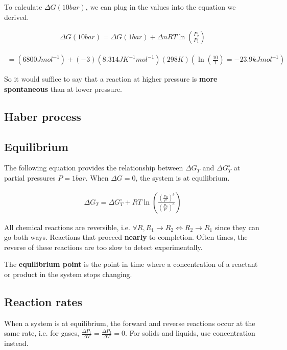 \documentclass[12pt]{book}
\begin{document}
To calculate $\Delta G(10 bar)$, we can plug in the values into the equation we derived.

\begin{align*}
    \Delta G(10 bar)=\Delta G(1 bar)+\Delta nRT\ln\left(\frac{P_2}{P_1}\right)
\end{align*}

\begin{align*}
    =(6800Jmol^{-1})+(-3)(8.314JK^{-1}mol^{-1})(298K)(\ln\left(\frac{10}{1}\right)=-23.9kJmol^{-1})
\end{align*}

So it would suffice to say that a reaction at higher pressure is \textbf{more spontaneous} than at lower pressure.

\subsection*{Haber process}

\subsection*{Equilibrium}

The following equation provides the relationship between $\Delta G_T$ and $\Delta G_T^{\circ}$ at partial pressures $P=1bar$. When $\Delta G=0$, the system is at equilibrium.

\begin{align*}
    \Delta G_T=\Delta G_T^{\circ}+RT\ln\left(\frac{\left(\frac{P_B}{P^{\circ}}\right)^b}{\left(\frac{P_A}{P^{\circ}}\right)^a}\right)
\end{align*}

All chemical reactions are reversible, i.e. $\forall R, R_1\rightarrow R_2\iff R_2\rightarrow R_1$ since they can go both ways. Reactions that proceed \textbf{nearly} to completion. Often times, the reverse of these reactions are too slow to detect experimentally.

The \textbf{equilibrium point} is the point in time where a concentration of a reactant or product in the system stops changing.

\subsection*{Reaction rates}

When a system is at equilibrium, the forward and reverse reactions occur at the same rate, i.e. for gases, $\frac{\Delta P_1}{\Delta T}=\frac{\Delta P_2}{\Delta T}=0$. For solids and liquids, use concentration instead.
\end{document}
